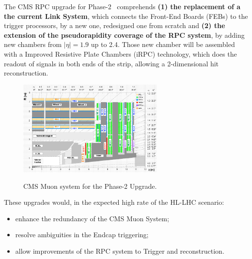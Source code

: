 The CMS RPC upgrade for Phase-2~\cite{muon_tdr} comprehends \textbf{(1) the replacement of a the current Link System}, which connects the Front-End Boards (FEBs) to the trigger processors, by a new one, redesigned one from scratch and \textbf{(2) the extension of the pseudorapidity coverage of the RPC system}, by adding new chambers from $|\eta| = 1.9$ up to 2.4. Those new chamber will be assembled with a Improved Resistive Plate Chambers (iRPC) technology, which does the readout of signals in both ends of the strip, allowing a 2-dimensional hit reconstruction. 


\begin{figure}
    \caption{\footnotesize CMS Muon system for the Phase-2 Upgrade.}
    \includegraphics[width=0.65\textwidth]{uioposter-images/cms_muon}
    \label{cms_muon_upgrade}
\end{figure}


These upgrades would, in the expected high rate of the HL-LHC scenario:
\begin{itemize}
    \item enhance the redundancy of the CMS Muon System;
    \item resolve ambiguities in the Endcap triggering;
    \item allow improvements of the RPC system to Trigger and reconstruction. 
\end{itemize} 

%




